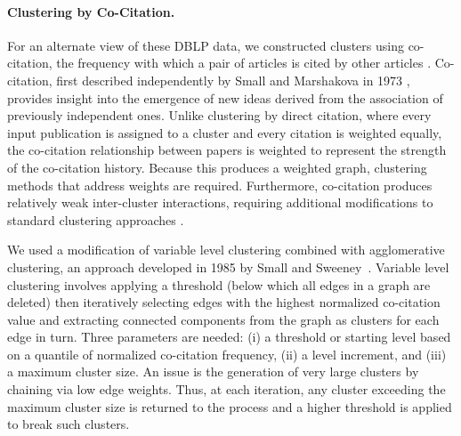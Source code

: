 \paragraph{Clustering by Co-Citation.}

For an alternate view of these DBLP data, we constructed clusters using co-citation, the frequency with which a pair of articles is cited by other articles \cite{small_co-citation_1973,marshakova-shaikevich_co-citation_1973}. %
Co-citation, first described independently by Small and Marshakova in 1973 \cite{marshakova-shaikevich_co-citation_1973}, provides insight into the emergence of new ideas derived from the association of previously independent ones. Unlike clustering by direct citation, where every input publication is assigned to a cluster and every citation is weighted equally, the co-citation relationship between papers is weighted to represent the strength of the co-citation history.
Because this produces a weighted graph, clustering methods that address weights are required.
Furthermore, co-citation produces relatively weak inter-cluster interactions, requiring additional modifications to standard clustering approaches \cite{boyack_cocitation_2010,boyack_improving_2013,small_structure_1974,small_clustering_1985}. 


We used a modification of variable level clustering combined with agglomerative clustering, an approach developed in 1985 by Small and Sweeney~\cite{small_clustering_1985}. 
Variable level clustering involves applying a threshold (below which all edges in a graph are deleted) then iteratively selecting edges with the highest normalized co-citation value and extracting connected components from the graph as clusters for each edge in turn. Three parameters are needed: (i) a threshold or starting level based on a quantile of normalized co-citation frequency, (ii) a level increment, and (iii) a maximum cluster size. An issue is the generation of very large clusters by chaining via low edge weights.  Thus, at each iteration, any cluster exceeding the maximum cluster size  is returned to the process and a higher threshold is applied to break such clusters.

